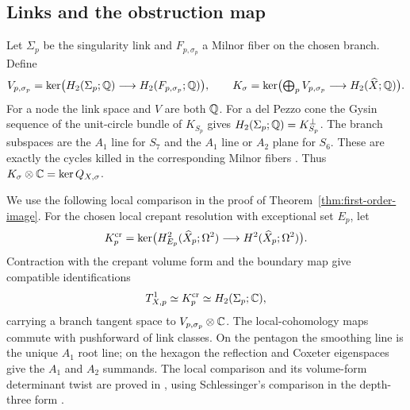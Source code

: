 \subsection{Links and the obstruction map}

Let $\Sigma_p$ be the singularity link and $F_{p,\sigma_p}$ a
Milnor fiber on the chosen branch. Define
\begin{equation}
 V_{p,\sigma_p}=\ker\bigl(H_2(\Sigma_p;\mathbb Q)
                       \longrightarrow H_2(F_{p,\sigma_p};\mathbb Q)\bigr),
 \qquad
 K_\sigma=\ker\bigl(\textstyle\bigoplus_pV_{p,\sigma_p}
                       \longrightarrow H_2(\widehat X;\mathbb Q)\bigr).
 \label{eq:milnor-kernel}
\end{equation}
For a node the link space and $V$ are both $\mathbb Q$.
For a del Pezzo cone the Gysin sequence of the unit-circle bundle
of $K_{S_p}$ gives $H_2(\Sigma_p;\mathbb Q)=K_{S_p}^\perp$.
The branch subspaces are the $A_1$ line for $S_7$ and the
$A_1$ line or $A_2$ plane for $S_6$. These are exactly the
cycles killed in the corresponding Milnor fibers
\cite[Proposition~2.1 and Section~2.4]{Wuebben:2026obstruction}.
Thus $K_\sigma\otimes\mathbb C=\ker Q_{X,\sigma}$.

We use the following local comparison in the proof of
Theorem~\ref{thm:first-order-image}. For the chosen local crepant
resolution with exceptional set $E_p$, let
\begin{equation}
 K_p^{\rm cr}=\ker\bigl(H^2_{E_p}(\widehat X_p;\Omega^2)
                       \longrightarrow H^2(\widehat X_p;\Omega^2)\bigr).
\end{equation}
Contraction with the crepant volume form and the boundary map give
compatible identifications
\begin{equation}
 T^1_{X,p}\simeq K_p^{\rm cr}\simeq H_2(\Sigma_p;\mathbb C),
 \label{eq:local-hodge-identification}
\end{equation}
carrying a branch tangent space to $V_{p,\sigma_p}\otimes\mathbb C$.
The local-cohomology maps commute with pushforward of link
classes. On the pentagon the smoothing line is the unique
$A_1$ root line; on the hexagon the reflection and Coxeter
eigenspaces give the $A_1$ and $A_2$ summands. The local
comparison and its volume-form determinant twist are proved in
\cite[Lemmas~2.3--2.4]{Wuebben:2026smoothing}, using
Schlessinger's comparison in the depth-three form
\cite{Schlessinger:1971,Friedman:2022}.

